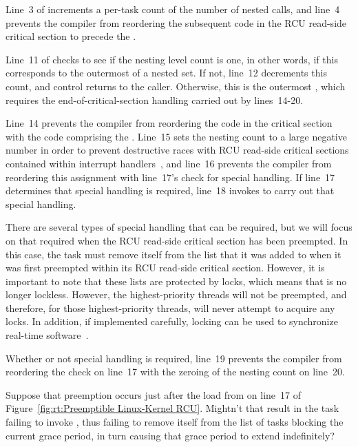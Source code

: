 Line~3 of  increments a per-task count of the
number of nested  calls, and
line~4 prevents the compiler from reordering the subsequent code in the
RCU read-side critical section to precede the .

Line~11 of  checks to see if the nesting level count
is one, in other words, if this corresponds to the outermost
 of a nested set.
If not, line~12 decrements this count, and control returns to the caller.
Otherwise, this is the outermost , which requires
the end-of-critical-section handling carried out by lines~14-20.

Line~14 prevents the compiler from reordering the code in the critical
section with the code comprising the .
Line~15 sets the nesting count to a large negative number in order to prevent
destructive races with RCU read-side critical sections contained within
interrupt handlers~\cite{PaulEMcKenney2011RCU3.0trainwreck},
and line~16 prevents the compiler from reordering this assignment with
line~17's check for special handling.
If line~17 determines that special handling is required, line~18
invokes  to carry out that special handling.

There are several types of special handling that can be required, but
we will focus on that required when the RCU read-side critical section
has been preempted.
In this case, the task must remove itself from the list that it was
added to when it was first preempted within its
RCU read-side critical section.
However, it is important to note that these lists are protected by locks,
which means that  is no longer lockless.
However, the highest-priority threads will not be preempted, and therefore,
for those highest-priority threads,  will never
attempt to acquire any locks.
In addition, if implemented carefully, locking can be used to synchronize
real-time software~\cite{BjoernBrandenburgPhD}.

Whether or not special handling is required, line~19 prevents the compiler
from reordering the check on line~17 with the zeroing of the nesting
count on line~20.

\QuickQuiz{}
	Suppose that preemption occurs just after the load from
	 on line~17 of
	Figure~\ref{fig:rt:Preemptible Linux-Kernel RCU}.
	Mightn't that result in the task failing to invoke
	, thus failing to remove itself
	from the list of tasks blocking the current grace period,
	in turn causing that grace period to extend indefinitely?
 \QuickQuizEnd

